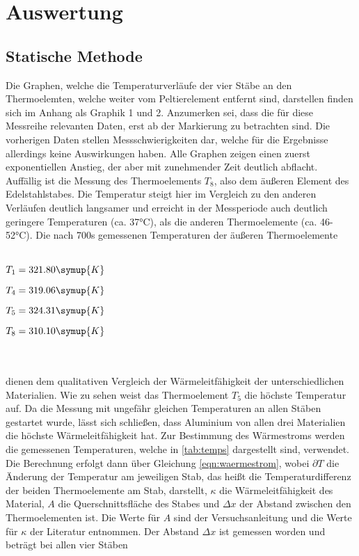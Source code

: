 \section{Auswertung}
\label{sec:Auswertung}
\subsection{Statische Methode}
Die Graphen, welche die Temperaturverläufe der vier Stäbe an den Thermoelemten, welche weiter vom Peltierelement entfernt sind, darstellen finden
sich im Anhang als Graphik 1 und 2. Anzumerken sei, dass die für diese Messreihe relevanten Daten, erst ab der Markierung zu betrachten sind. Die vorherigen
Daten stellen Messschwierigkeiten dar, welche für die Ergebnisse allerdings keine Auswirkungen haben. Alle Graphen zeigen einen zuerst exponentiellen 
Anstieg, der aber mit zunehmender Zeit deutlich abflacht. Auffällig ist die Messung des Thermoelements $T_8$, also dem äußeren Element des Edelstahlstabes. Die Temperatur 
steigt hier im Vergleich zu den anderen Verläufen deutlich langsamer und erreicht in der Messperiode auch deutlich geringere Temperaturen (ca. 37°C), als die 
anderen Thermoelemente (ca. 46-52°C). Die nach 700s gemessenen Temperaturen der äußeren Thermoelemente
\\ \\
\centerline{$T_1 = 321.80 \symup{K}$}
\centerline{$T_4 =  319.06 \symup{K}$}
\centerline{$T_5 =  324.31 \symup{K}$}
\centerline{$T_8 =  310.10 \symup{K}$}
\\ \\
dienen dem qualitativen Vergleich der Wärmeleitfähigkeit der unterschiedlichen Materialien.
Wie zu sehen weist das Thermoelement $T_5$ die höchste Temperatur auf. Da die Messung mit ungefähr gleichen Temperaturen an allen Stäben gestartet wurde,
lässt sich schließen, dass Aluminium von allen drei Materialien die höchste Wärmeleitfähigkeit hat. 
Zur Bestimmung des Wärmestroms werden die gemessenen Temperaturen, welche in \autoref{tab:temps} dargestellt sind, verwendet. 
Die Berechnung erfolgt dann über Gleichung \eqref{eqn:waermestrom}, wobei $\partial T$ die Änderung der Temperatur am jeweiligen Stab, das heißt 
die Temperaturdifferenz der beiden Thermoelemente am Stab, darstellt, $\kappa$ die Wärmeleitfähigkeit des Material, $A$ die Querschnittsfläche des Stabes und $\Delta x$ der Abstand zwischen den Thermoelementen ist.
Die Werte für $A$ sind der Versuchsanleitung \cite[2]{v204} und die Werte für $\kappa$ der Literatur \cite{internet} entnommen. Der Abstand $\Delta x$ ist gemessen worden und beträgt bei allen vier Stäben
